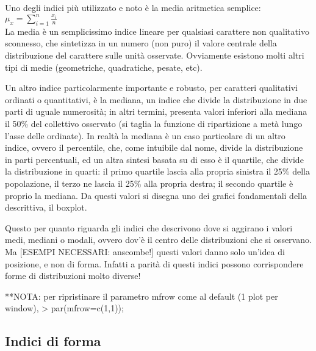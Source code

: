 \documentclass[a4paper]{article}
\begin{document}
Uno degli indici più utilizzato e noto \`{e} la media aritmetica semplice:
\\
\begin{math}
 \mu_x=\sum_{i=1}^n \frac{x_i}{n}
\end{math}
\\
La media \`{e} un semplicissimo indice lineare per qualsiasi carattere non qualitativo sconnesso, che sintetizza in un numero (non puro) il valore centrale della distribuzione del carattere sulle unit\`{a} osservate. Ovviamente esistono molti altri tipi di medie (geometriche, quadratiche, pesate, etc).

Un altro indice particolarmente importante e robusto, per caratteri qualitativi ordinati o quantitativi, \`{e} la mediana, un indice che divide la distribuzione in due parti di uguale numerosit\`{a}; in altri termini, presenta valori inferiori alla mediana il 50\% del collettivo osservato (si taglia la funzione di ripartizione a met\`{a} lungo l'asse delle ordinate).
In realt\`{a} la mediana \`{e} un caso particolare di un altro indice, ovvero il percentile, che, come intuibile dal nome, divide la distribuzione in parti percentuali, ed un altra sintesi basata su di esso \`{e} il quartile, che divide la distribuzione in quarti: il primo quartile lascia alla propria sinistra il 25\% della popolazione, il terzo ne lascia il 25\% alla propria destra; il secondo quartile \`{e} proprio la mediana.
Da questi valori si disegna uno dei grafici fondamentali della descrittiva, il boxplot.



Questo per quanto riguarda gli indici che descrivono dove si aggirano i valori medi, mediani o modali, ovvero dov'\`{e} il centro delle distribuzioni che si osservano. Ma [ESEMPI NECESSARI: anscombe!] questi valori danno solo un'idea di posizione, e non di forma. Infatti a parit\`{a} di questi indici possono corrispondere forme di distribuzioni molto diverse!



**NOTA: per ripristinare il parametro mfrow come al default (1 plot per window), > par(mfrow=c(1,1));

\subsection{Indici di forma}
\end{document}

